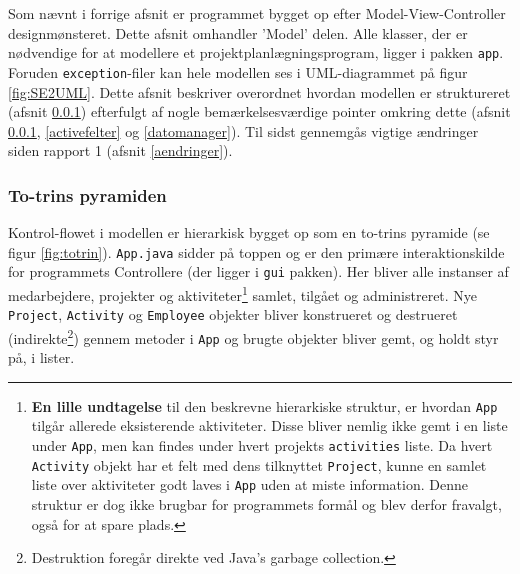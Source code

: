 Som nævnt i forrige afsnit er programmet bygget op efter Model-View-Controller designmønsteret. Dette afsnit omhandler 'Model' delen. Alle klasser, der er nødvendige for at modellere et projektplanlægningsprogram, ligger i pakken \texttt{app}. Foruden \texttt{exception}-filer kan hele modellen ses i UML-diagrammet på figur \ref{fig:SE2UML}. Dette afsnit beskriver overordnet hvordan modellen er struktureret (afsnit \ref{totrin}) efterfulgt af nogle bemærkelsesværdige pointer omkring dette (afsnit \ref{totrin}, \ref{activefelter} og \ref{datomanager}). Til sidst gennemgås vigtige ændringer siden rapport 1 (afsnit \ref{aendringer}).

\subsubsection{To-trins pyramiden}
\label{totrin}
Kontrol-flowet i modellen er hierarkisk bygget op som en to-trins pyramide (se figur \ref{fig:totrin}). \texttt{App.java} sidder på toppen og er den primære interaktionskilde for programmets Controllere (der ligger i \texttt{gui} pakken). Her bliver alle instanser af medarbejdere, projekter og aktiviteter\footnote{\textbf{En lille undtagelse} til den beskrevne hierarkiske struktur, er hvordan \texttt{App} tilgår allerede eksisterende aktiviteter. Disse bliver nemlig ikke gemt i en liste under \texttt{App}, men kan findes under hvert projekts \texttt{activities} liste. Da hvert \texttt{Activity} objekt har et felt med dens tilknyttet \texttt{Project}, kunne en samlet liste over aktiviteter godt laves i \texttt{App} uden at miste information. Denne struktur er dog ikke brugbar for programmets formål og blev derfor fravalgt, også for at spare plads.} samlet, tilgået og administreret. Nye \texttt{Project}, \texttt{Activity} og \texttt{Employee} objekter bliver konstrueret og destrueret (indirekte\footnote{Destruktion foregår direkte ved Java's garbage collection.}) gennem metoder i \texttt{App} og brugte objekter bliver gemt, og holdt styr på, i lister. 

